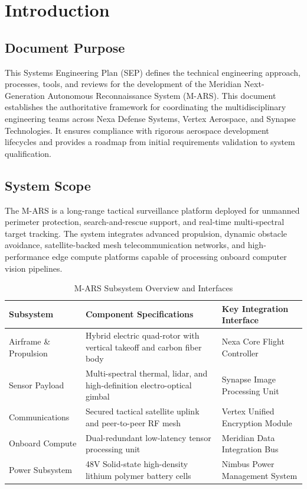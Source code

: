 \documentclass[10pt,letterpaper]{article}
\begin{document}
\tableofcontents
\vspace{1cm}


\section{Introduction}

\subsection{Document Purpose}
This Systems Engineering Plan (SEP) defines the technical engineering approach, processes, tools, and reviews for the development of the Meridian Next-Generation Autonomous Reconnaissance System (M-ARS). This document establishes the authoritative framework for coordinating the multidisciplinary engineering teams across Nexa Defense Systems, Vertex Aerospace, and Synapse Technologies. It ensures compliance with rigorous aerospace development lifecycles and provides a roadmap from initial requirements validation to system qualification.

\subsection{System Scope}
The M-ARS is a long-range tactical surveillance platform deployed for unmanned perimeter protection, search-and-rescue support, and real-time multi-spectral target tracking. The system integrates advanced propulsion, dynamic obstacle avoidance, satellite-backed mesh telecommunication networks, and high-performance edge compute platforms capable of processing onboard computer vision pipelines.

\begin{table}[htbp]
\centering
\caption{M-ARS Subsystem Overview and Interfaces}
\label{tab:system_chars}
\small
\begin{tabularx}{\textwidth}{l p{5cm} X}
\toprule
\textbf{Subsystem} & \textbf{Component Specifications} & \textbf{Key Integration Interface} \\
\midrule
Airframe \& Propulsion & Hybrid electric quad-rotor with vertical takeoff and carbon fiber body & Nexa Core Flight Controller \\
Sensor Payload & Multi-spectral thermal, lidar, and high-definition electro-optical gimbal & Synapse Image Processing Unit \\
Communications & Secured tactical satellite uplink and peer-to-peer RF mesh & Vertex Unified Encryption Module \\
Onboard Compute & Dual-redundant low-latency tensor processing unit & Meridian Data Integration Bus \\
Power Subsystem & 48V Solid-state high-density lithium polymer battery cells & Nimbus Power Management System \\
\bottomrule
\end{tabularx}
\end{table}
\end{document}
